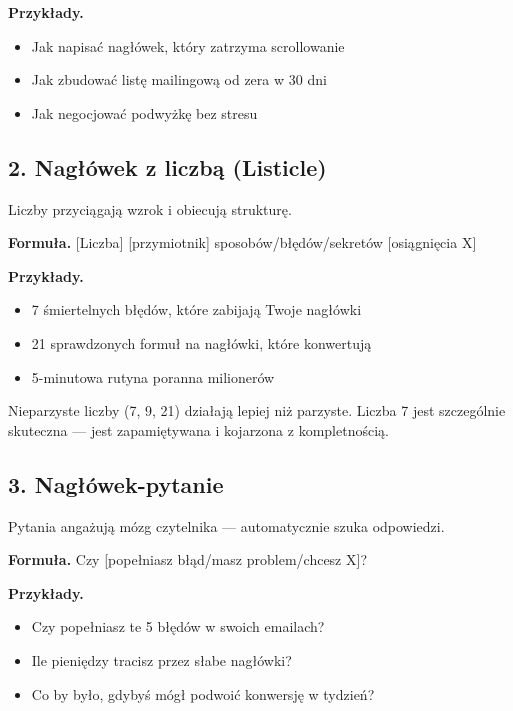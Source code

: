 \documentclass[
  12pt,
  a4paper,
  twoside,
  openright,
  12pt,
  DIV=12,
  BCOR=12mm]{scrbook}
\providecommand{\tightlist}{%
  \setlength{\itemsep}{0pt}\setlength{\parskip}{0pt}}\usepackage{longtable,booktabs,array}
\begin{document}
\textbf{Przykłady.}

\begin{itemize}
\tightlist
\item
  Jak napisać nagłówek, który zatrzyma scrollowanie
\item
  Jak zbudować listę mailingową od zera w 30 dni
\item
  Jak negocjować podwyżkę bez stresu
\end{itemize}

\subsection{2. Nagłówek z liczbą
(Listicle)}\label{nagux142uxf3wek-z-liczbux105-listicle}

Liczby przyciągają wzrok i obiecują strukturę.

\textbf{Formuła.} {[}Liczba{]} {[}przymiotnik{]}
sposobów/błędów/sekretów {[}osiągnięcia X{]}

\textbf{Przykłady.}

\begin{itemize}
\tightlist
\item
  7 śmiertelnych błędów, które zabijają Twoje nagłówki
\item
  21 sprawdzonych formuł na nagłówki, które konwertują
\item
  5-minutowa rutyna poranna milionerów
\end{itemize}

\begin{wskazowka}
Nieparzyste liczby (7, 9, 21) działają lepiej niż parzyste. Liczba 7 jest szczególnie skuteczna --- jest zapamiętywana i kojarzona z kompletnością.
\end{wskazowka}

\subsection{3. Nagłówek-pytanie}\label{nagux142uxf3wek-pytanie}

Pytania angażują mózg czytelnika --- automatycznie szuka odpowiedzi.

\textbf{Formuła.} Czy {[}popełniasz błąd/masz problem/chcesz X{]}?

\textbf{Przykłady.}

\begin{itemize}
\tightlist
\item
  Czy popełniasz te 5 błędów w swoich emailach?
\item
  Ile pieniędzy tracisz przez słabe nagłówki?
\item
  Co by było, gdybyś mógł podwoić konwersję w tydzień?
\end{itemize}
\end{document}
